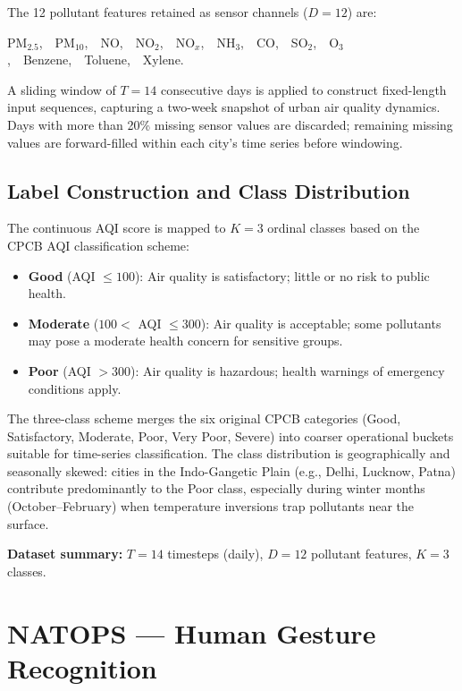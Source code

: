 The 12 pollutant features retained as sensor channels ($D = 12$) are:
\begin{center}
PM$_{2.5}$,\ \ PM$_{10}$,\ \ NO,\ \ NO$_2$,\ \ NO$_x$,\ \ NH$_3$,\ \ CO,\ \ SO$_2$,\ \ O$_3$,\ \ Benzene,\ \ Toluene,\ \ Xylene.
\end{center}

A sliding window of $T = 14$ consecutive days is applied to construct fixed-length input sequences, capturing a two-week snapshot of urban air quality dynamics. Days with more than 20\% missing sensor values are discarded; remaining missing values are forward-filled within each city's time series before windowing.

\subsection{Label Construction and Class Distribution}

The continuous AQI score is mapped to $K = 3$ ordinal classes based on the CPCB AQI classification scheme:

\begin{itemize}
    \item \textbf{Good} (AQI $\leq 100$): Air quality is satisfactory; little or no risk to public health.
    \item \textbf{Moderate} ($100 <$ AQI $\leq 300$): Air quality is acceptable; some pollutants may pose a moderate health concern for sensitive groups.
    \item \textbf{Poor} (AQI $> 300$): Air quality is hazardous; health warnings of emergency conditions apply.
\end{itemize}

The three-class scheme merges the six original CPCB categories (Good, Satisfactory, Moderate, Poor, Very Poor, Severe) into coarser operational buckets suitable for time-series classification. The class distribution is geographically and seasonally skewed: cities in the Indo-Gangetic Plain (e.g., Delhi, Lucknow, Patna) contribute predominantly to the Poor class, especially during winter months (October–February) when temperature inversions trap pollutants near the surface.

\textbf{Dataset summary:} $T = 14$ timesteps (daily), $D = 12$ pollutant features, $K = 3$ classes.

\section{NATOPS — Human Gesture Recognition}

